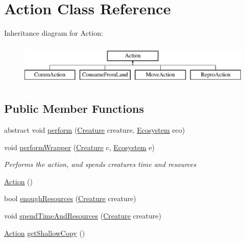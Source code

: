 \hypertarget{class_action}{}\section{Action Class Reference}
\label{class_action}
Inheritance diagram for Action\+:\begin{figure}[H]
\begin{center}
\leavevmode
\includegraphics[height=2.000000cm]{class_action}
\end{center}
\end{figure}
\subsection*{Public Member Functions}
\begin{DoxyCompactItemize}
\item 
abstract void \mbox{\hyperlink{class_action_a2aedfc3be16448fbf224cb13607de3c0}{perform}} (\mbox{\hyperlink{class_creature}{Creature}} creature, \mbox{\hyperlink{class_ecosystem}{Ecosystem}} eco)
\item 
void \mbox{\hyperlink{class_action_a1f677dca95b97037f8e0e4bb6b225cb8}{perform\+Wrapper}} (\mbox{\hyperlink{class_creature}{Creature}} c, \mbox{\hyperlink{class_ecosystem}{Ecosystem}} e)
\begin{DoxyCompactList}\small\item\em Performs the action, and spends creatures time and resources \end{DoxyCompactList}\item 
\mbox{\hyperlink{class_action_aed886910937b93b956b61cff7be572bc}{Action}} ()
\item 
bool \mbox{\hyperlink{class_action_a6217cfff19f5f6f7e0638f4dd777864b}{enough\+Resources}} (\mbox{\hyperlink{class_creature}{Creature}} creature)
\item 
void \mbox{\hyperlink{class_action_a4a96d3be0975ce16929ff25f04668189}{spend\+Time\+And\+Resources}} (\mbox{\hyperlink{class_creature}{Creature}} creature)
\item 
\mbox{\hyperlink{class_action}{Action}} \mbox{\hyperlink{class_action_a0c5e2efad9169883c02a215679d0b8be}{get\+Shallow\+Copy}} ()
\end{DoxyCompactItemize}
